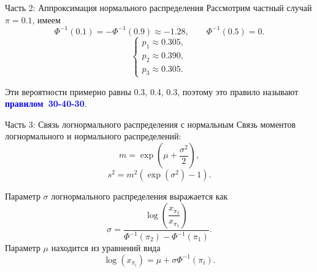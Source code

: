 \documentclass[ucs, notheorems, handout]{beamer}
\begin{document}
\begin{frame}{Часть 2: Аппроксимация нормального распределения}
	Рассмотрим частный случай $\pi = 0.1$, имеем 
	$$\Phi ^{-1}(0.1) = -\Phi ^{-1}(0.9) \approx  -1.28, \qquad \Phi ^{-1}(0.5) = 0. $$
	\begin{equation*}
		\begin{cases}
			p_{1}\approx 0.305, \\ 
			p_{2}\approx 0.390,  \\ 
			p_{3}\approx 0.305.
		\end{cases}
	\end{equation*}
	
	Эти вероятности примерно равны 0.3, 0.4, 0.3, поэтому это правило называют \textcolor{blue}{\hbox{\textbf{правилом 30-40-30}}}.
	
\end{frame}	

\begin{frame}{Часть 3: Связь логнормального распределения с нормальным}
	Связь моментов логнормального и нормального распределений:
	\begin{equation*}
		m = \exp\left( \mu+\frac{\sigma ^{2}}{2}\right) ,
	\end{equation*} \label{10}
	\begin{equation*}
		s^{2} = m^{2}(\exp(\sigma^{2})-1).
	\end{equation*} \label{11}
	
	Параметр $\sigma$ логнормального распределения выражается как
	\begin{equation*}
		\displaystyle{\sigma = \dfrac{\log\left(\dfrac{x_{\pi_{2}}}{x_{\pi_{1}}}\right)}{\Phi ^{-1}(\pi_{2}) - \Phi ^{-1}(\pi_{1})}}.
	\end{equation*} \label{13}
	Параметр $\mu$ находится из уравнений вида
	\begin{equation*}
		\log(x_{\pi_{i}}) = \mu + \sigma\Phi ^{-1}(\pi_{i}).
	\end{equation*}
\end{frame}
\end{document}
